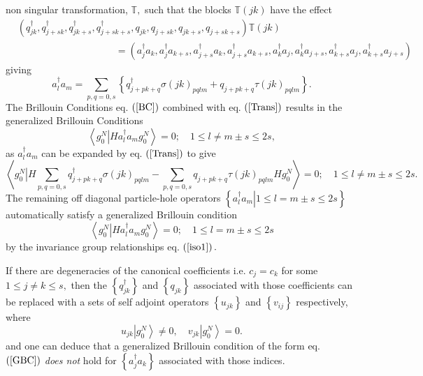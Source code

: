 \documentclass[aps,preprint]{revtex4}%
\begin{document}
non singular transformation, $\mathbb{T},$ such that the blocks $\mathbb{T}%
\left(  jk\right)  $ have the effect
\begin{align}
&  \left(  q_{jk}^{\dagger},q_{j+sk}^{\dagger},q_{jk+s}^{\dagger}%
,q_{j+sk+s}^{\dagger},q_{jk},q_{j+sk},q_{jk+s},q_{j+sk+s}\right)
\mathbb{T}\left(  jk\right)  \nonumber\\
&  \qquad\qquad\qquad\qquad\qquad\left.  =\right.  \left(  a_{j}^{\dagger
}a_{k},a_{j}^{\dagger}a_{k+s},a_{j+s}^{\dagger}a_{k},a_{j+s}^{\dagger}%
a_{k+s},a_{k}^{\dagger}a_{j},a_{k}^{\dagger}a_{j+s},a_{k+s}^{\dagger}%
a_{j},a_{k+s}^{\dagger}a_{j+s}\right)
\end{align}
giving
\begin{equation}
a_{l}^{\dagger}a_{m}=\sum_{p,q=0,s}\left\{  q_{j+pk+q}^{\dagger}\sigma\left(
jk\right)  _{pqlm}+q_{j+pk+q}\tau\left(  jk\right)  _{pqlm}\right\}
.\label{Trans}%
\end{equation}
The Brillouin Conditions eq. $\left(  \ref{BC}\right)  $ combined with eq.
$\left(  \ref{Trans}\right)  $ results in the generalized Brillouin
Conditions
\begin{equation}
\left\langle \left.  g_{0}^{N}\right\vert Ha_{l}^{\dagger}a_{m}g_{0}%
^{N}\right\rangle =0;\quad1\leq l\neq m\pm s\leq2s,\label{GBC}%
\end{equation}
as $a_{l}^{\dagger}a_{m}$ can be expanded by eq. $\left(  \ref{Trans}\right)
$ to give%
\begin{equation}
\left\langle \left.  g_{0}^{N}\right\vert H\sum_{p,q=0,s}q_{j+pk+q}^{\dagger
}\sigma\left(  jk\right)  _{pqlm}-\sum_{p,q=0,s}q_{j+pk+q}\tau\left(
jk\right)  _{pqlm}Hg_{0}^{N}\right\rangle =0;\quad1\leq l\neq m\pm s\leq2s.
\end{equation}
The remaining off diagonal particle-hole operators $\left\{  \left.
a_{l}^{\dagger}a_{m}\right\vert 1\leq l=m\pm s\leq2s\right\}  $ automatically
satisfy a generalized Brillouin condition
\begin{equation}
\left\langle \left.  g_{0}^{N}\right\vert Ha_{l}^{\dagger}a_{m}g_{0}%
^{N}\right\rangle =0;\quad1\leq l=m\pm s\leq2s
\end{equation}
by the invariance group relationships eq. $\left(  \ref{iso1}\right)  .$

If there are degeneracies of the canonical coefficients i.e. $c_{j}=c_{k}$ for
some $1\leq j\neq k\leq s,$ then the $\left\{  q_{jk}^{\dagger}\right\}  $ and
$\left\{  q_{jk}\right\}  $ associated with those coefficients can be replaced
\cite{Goscinski82a} with a sets of self adjoint operators $\left\{
u_{jk}\right\}  $ and $\left\{  v_{ij}\right\}  $ respectively, where
\begin{equation}
u_{jk}\left\vert g_{0}^{N}\right\rangle \neq0,\quad v_{jk}\left\vert g_{0}%
^{N}\right\rangle =0.
\end{equation}
and one can deduce that a generalized Brillouin condition of the form eq.
$\left(  \ref{GBC}\right)  $ \emph{does not} hold for $\left\{  a_{j}%
^{\dagger}a_{k}\right\}  $ associated with those indices.
\end{document}
